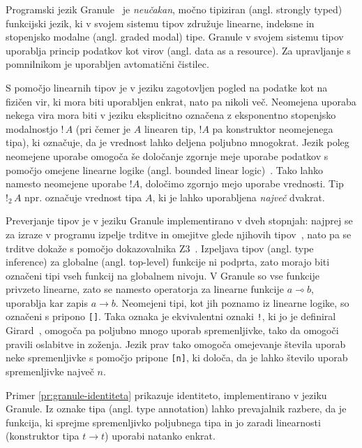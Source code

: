 Programski jezik Granule~\cite{orchard2019quantitative} je \textit{neučakan}, močno tipiziran (angl. strongly typed) funkcijski jezik, ki v svojem sistemu tipov združuje linearne, indeksne in stopenjsko modalne (angl. graded modal) tipe. Granule v svojem sistemu tipov uporablja princip podatkov kot virov (angl. data as a resource). Za upravljanje s pomnilnikom je uporabljen avtomatični čistilec. 

S pomočjo linearnih tipov je v jeziku zagotovljen pogled na podatke kot na fizičen vir, ki mora biti uporabljen enkrat, nato pa nikoli več. Neomejena uporaba nekega vira mora biti v jeziku eksplicitno označena z eksponentno stopenjsko modalnostjo $! \, A$ (pri čemer je $A$ linearen tip, $!A$ pa konstruktor neomejenega tipa), ki označuje, da je vrednost lahko deljena poljubno mnogokrat. Jezik poleg neomejene uporabe omogoča še določanje zgornje meje uporabe podatkov s pomočjo omejene linearne logike (angl. bounded linear logic)~\cite{girard1992bounded}. Tako lahko namesto neomejene uporabe $!A$, določimo zgornjo mejo uporabe vrednosti. Tip $!_2 \, A$ npr. označuje vrednost tipa $A$, ki je lahko uporabljena \textit{največ} dvakrat.

Preverjanje tipov je v jeziku Granule implementirano v dveh stopnjah: najprej se za izraze v programu izpelje trditve in omejitve glede njihovih tipov~\cite{orchard2019quantitative}, nato pa se trditve dokaže s pomočjo dokazovalnika Z3~\cite{demoura2008z3}. Izpeljava tipov (angl. type inference) za globalne (angl. top-level) funkcije ni podprta, zato morajo biti označeni tipi vseh funkcij na globalnem nivoju. V Granule so vse funkcije privzeto linearne, zato se namesto operatorja za linearne funkcije $a \multimap b$, uporablja kar zapis $a \to b$. Neomejeni tipi, kot jih poznamo iz linearne logike, so označeni s pripono \texttt{[]}. Taka oznaka je ekvivalentni oznaki \texttt{!}, ki jo je definiral Girard~\cite{girard1987linear}, omogoča pa poljubno mnogo uporab spremenljivke, tako da omogoči pravili oslabitve in zoženja. Jezik prav tako omogoča omejevanje števila uporab neke spremenljivke s pomočjo pripone \texttt{[n]}, ki določa, da je lahko število uporab spremenljivke največ $n$.

Primer \ref{pr:granule-identiteta} prikazuje identiteto, implementirano v jeziku Granule. Iz oznake tipa (angl. type annotation) lahko prevajalnik razbere, da je  funkcija, ki sprejme spremenljivko poljubnega tipa in jo zaradi linearnosti (konstruktor tipa $t \to t$) uporabi natanko enkrat.

